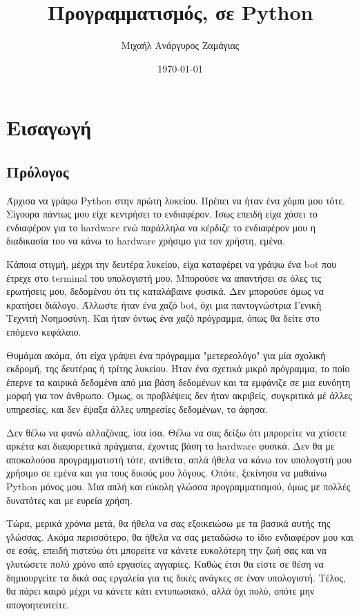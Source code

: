 \documentclass[a4paper,14pt]{extreport}
\title{Προγραμματισμός, σε Python}
\author{Μιχαήλ Ανάργυρος Ζαμάγιας}
\date{\today}
\begin{document}
\maketitle

\tableofcontents

\chapter{Εισαγωγή}
\newpage
\section{Πρόλογος}
Άρχισα να γράφω Python στην πρώτη λυκείου. Πρέπει να ήταν ένα χόμπι μου τότε. Σίγουρα πάντως μου είχε κεντρήσει το ενδιαφέρον. Ίσως επειδή είχα χάσει το ενδιαφέρον για το hardware ενώ παράλληλα να κέρδιζε το ενδιαφέρον μου η διαδικασία του να κάνω το hardware χρήσιμο για τον χρήστη, εμένα.

Κάποια στιγμή, μέχρι την δευτέρα λυκείου, είχα καταφέρει να γράψω ένα bot που έτρεχε στο terminal του υπολογιστή μου. Μπορούσε να απαντήσει σε όλες τις ερωτήσεις μου, δεδομένου ότι τις καταλάβαινε φυσικά. Δεν μπορούσε όμως να κρατήσει διάλογο. Άλλωστε ήταν ένα χαζό bot, όχι μια παντογνώστρια Γενική Τεχνιτή Νοημοσύνη. Και ήταν όντως ένα χαζό πρόγραμμα, όπως θα δείτε στο επόμενο κεφάλαιο.

Θυμάμαι ακόμα, ότι είχα γράψει ένα πρόγραμμα "μετερεολόγο" για μία σχολική εκδρομή, της δευτέρας ή τρίτης λυκείου. Ήταν ένα σχετικά μικρό πρόγραμμα, το  ποίο έπερνε τα καιρικά δεδομένα από μια βάση δεδομένων και τα εμφάνιζε σε μια ευνόητη μορφή για τον άνθρωπο. Όμως, οι προβλέψεις δεν ήταν ακριβείς, συγκριτικά μέ άλλες υπηρεσίες, και δεν έψαξα άλλες υπηρεσίες δεδομένων, το άφησα.

Δεν θέλω να φανώ αλλαζόνας, ίσα ίσα. Θέλω να σας δείξω ότι μπρορείτε να χτίσετε αρκέτα και διαφορετικά πράγματα, έχοντας βάση το hardware φυσικά. Δεν θα με αποκαλούσα προγραμματιστή τότε, αντίθετα, απλά ήθελα να κάνω τον υπολογστή μου χρήσιμο σε εμένα και για τους δικούς μου λόγους. Οπότε, ξεκίνησα να μαθαίνω Python μόνος μου. Μια απλή και εύκολη γλώσσα προγραμματισμού, όμως με πολλές δυνατότες και με ευρεία χρήση.

Τώρα, μερικά χρόνια μετά, θα ήθελα να σας εξοικειώσω με τα βασικά αυτής της  γλώσσας. Ακόμα περισσότερο, θα ήθελα να σας μεταδώσω το ίδιο ενδιαφέρον μου και σε εσάς, επειδή πιστεύω ότι μπορείτε να κάνετε ευκολότερη την ζωή σας και να γλυτώσετε πολύ χρόνο από εργασίες αγγαρίες. Καθώς έτσι θα είστε σε θέση να δημιουργείτε τα δικά σας εργαλεία για τις δικές ανάγκες σε έναν υπολογιστή. Τέλος, θα πάρει καιρό μέχρι να κάνετε κάτι εντυπωσιακό, αλλά όχι πολύ, οπότε μην απογοητευτείτε.
\end{document}

